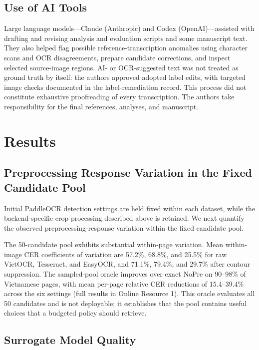 \documentclass[pdflatex,sn-basic,Numbered,iicol]{sn-jnl}
\begin{document}
\subsection{Use of AI Tools}

Large language models---Claude (Anthropic) and Codex (OpenAI)---assisted with drafting and revising analysis and evaluation scripts and some manuscript text. They also helped flag possible reference-transcription anomalies using character scans and OCR disagreements, prepare candidate corrections, and inspect selected source-image regions. AI- or OCR-suggested text was not treated as ground truth by itself: the authors approved adopted label edits, with targeted image checks documented in the label-remediation record. This process did not constitute exhaustive proofreading of every transcription. The authors take responsibility for the final references, analyses, and manuscript.

\section{Results}
\label{sec:results}

\subsection{Preprocessing Response Variation in the Fixed Candidate Pool}

Initial PaddleOCR detection settings are held fixed within each dataset, while the backend-specific crop processing described above is retained. We next quantify the observed preprocessing-response variation within the fixed candidate pool.

The 50-candidate pool exhibits substantial within-page variation. Mean within-image CER coefficients of variation are 57.2\%, 68.8\%, and 25.5\% for raw VietOCR, Tesseract, and EasyOCR, and 71.1\%, 79.4\%, and 29.7\% after contour suppression. The sampled-pool oracle improves over exact NoPre on 90--98\% of Vietnamese pages, with mean per-page relative CER reductions of 15.4--39.4\% across the six settings (full results in Online Resource 1). This oracle evaluates all 50 candidates and is not deployable; it establishes that the pool contains useful choices that a budgeted policy should retrieve.

\subsection{Surrogate Model Quality}
\end{document}
